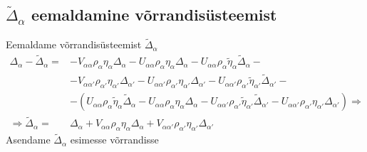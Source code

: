 \documentclass[class=article, crop=false]{standalone}
\begin{document}
\subsection{$ \tilde{ \Delta}_{ \alpha} $ eemaldamine võrrandisüsteemist}
Eemaldame võrrandisüsteemist $ \tilde{ \Delta}_{ \alpha} $
\begin{equation}\label{key}
	\begin{split}
		\Delta_{ \alpha} - \tilde{ \Delta}_{ \alpha} = & - V_{ \alpha \alpha} \rho_{ \alpha} \eta_{ \alpha} \Delta_{ \alpha} - U_{ \alpha \alpha} \rho_{ \alpha} \eta_{ \alpha} \Delta_{ \alpha} - U_{ \alpha \alpha} \rho_{ \alpha} \tilde{ \eta}_{ \alpha} \tilde{ \Delta}_{ \alpha} - \\
		& - V_{ \alpha \alpha'} \rho_{ \alpha'} \eta_{ \alpha'} \Delta_{ \alpha'} - U_{ \alpha \alpha'} \rho_{ \alpha'} \eta_{ \alpha'} \Delta_{ \alpha'} - U_{ \alpha \alpha'} \rho_{ \alpha'} \tilde{ \eta}_{ \alpha'} \tilde{ \Delta}_{ \alpha'} - \\
		& - (U_{ \alpha \alpha} \rho_{ \alpha} \tilde{ \eta}_{ \alpha} \tilde{ \Delta}_{ \alpha} - U_{ \alpha \alpha} \rho_{ \alpha} \eta_{ \alpha} \Delta_{ \alpha} - U_{ \alpha \alpha'} \rho_{ \alpha'} \tilde{ \eta}_{ \alpha'} \tilde{ \Delta}_{ \alpha'} - U_{ \alpha \alpha'} \rho_{ \alpha'} \eta_{ \alpha'} \Delta_{ \alpha'}) \Rightarrow \\
		\Rightarrow \tilde{ \Delta}_{ \alpha} = & \Delta_{ \alpha} + V_{ \alpha \alpha} \rho_{ \alpha} \eta_{ \alpha} \Delta_{ \alpha} + V_{ \alpha \alpha'} \rho_{ \alpha'} \eta_{ \alpha'} \Delta_{ \alpha'}
	\end{split}
\end{equation}
Asendame $ \tilde{ \Delta}_{ \alpha} $ esimesse võrrandisse
\end{document}
